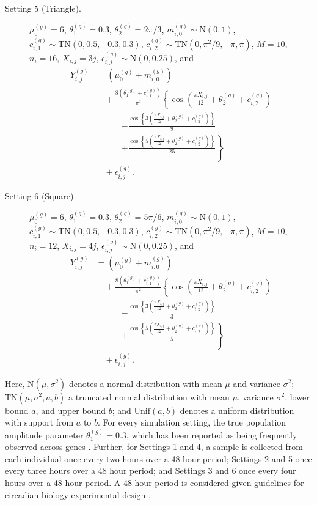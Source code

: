 \begin{description}
    \item[Setting 5 (Triangle).] $\mu^{(g)}_0=6$, $\theta^{(g)}_1 = 0.3$, $\theta^{(g)}_2 = 2\pi/3$, $m^{(g)}_{i,0} \sim \mathrm{N}(0, 1)$, $c^{(g)}_{i,1} \sim \mathrm{TN}(0, 0.5, -0.3, 0.3)$, $c^{(g)}_{i,2} \sim \mathrm{TN}(0, \pi^2/9, -\pi, \pi)$, $M = 10$, $n_i = 16$, $X_{i,j}=3j$, $\epsilon^{(g)}_{i,j} \sim \text{N}(0, 0.25)$, and 
    \begin{align*}
        Y^{(g)}_{i,j} &= (\mu^{(g)}_0+m^{(g)}_{i,0}) \\
        & \quad + \frac{8(\theta^{(g)}_1+c^{(g)}_{i,1})}{\pi^2}\left\{\cos\left(\frac{\pi X_{i,j}}{12} + \theta^{(g)}_2 + c^{(g)}_{i,2} \right) \right. \\
        & \quad \quad \quad \left. - \frac{\cos\left\{3\left(\frac{\pi X_{i,j}}{12} +  \theta^{(g)}_2 + c^{(g)}_{i,2} \right)\right\}}{9} \right. \\
        & \quad \quad \quad \left. + \frac{\cos\left\{5\left(\frac{\pi X_{i,j}}{12} +  \theta^{(g)}_2 + c^{(g)}_{i,2} \right)\right\}}{25}\right\} \\
        & \quad +\epsilon^{(g)}_{i,j}.
    \end{align*}
    \item[Setting 6 (Square).] $\mu^{(g)}_0=6$, $\theta^{(g)}_1 = 0.3$, $\theta^{(g)}_2 = 5\pi/6$, $m^{(g)}_{i,0} \sim \mathrm{N}(0, 1)$, $c^{(g)}_{i,1} \sim \mathrm{TN}(0, 0.5, -0.3, 0.3)$, $c^{(g)}_{i,2} \sim \mathrm{TN}(0, \pi^2/9, -\pi, \pi)$, $M = 10$, $n_i = 12$, $X_{i,j}=4j$, $\epsilon^{(g)}_{i,j} \sim \text{N}(0, 0.25)$, and \begin{align*}
        Y^{(g)}_{i,j} &= (\mu^{(g)}_0+m^{(g)}_{i,0}) \\
        & \quad + \frac{8(\theta^{(g)}_1+c^{(g)}_{i,1})}{\pi^2}\left\{\cos\left(\frac{\pi X_{i,j}}{12} + \theta^{(g)}_2 + c^{(g)}_{i,2} \right) \right. \\
        & \quad \quad \quad \left. - \frac{\cos\left\{3\left(\frac{\pi X_{i,j}}{12} +  \theta^{(g)}_2 + c^{(g)}_{i,2} \right)\right\}}{3} \right. \\
        & \quad \quad \quad \left. + \frac{\cos\left\{5\left(\frac{\pi X_{i,j}}{12} +  \theta^{(g)}_2 + c^{(g)}_{i,2} \right)\right\}}{5}\right\} \\
        & \quad +\epsilon^{(g)}_{i,j}.
    \end{align*}
 \end{description}
Here, $\mathrm{N}(\mu, \sigma^2)$ denotes a normal distribution with mean $\mu$ and variance $\sigma^2$; $\mathrm{TN}(\mu, \sigma^2, a, b)$ a truncated normal distribution with mean $\mu$, variance $\sigma^2$, lower bound $a$, and upper bound $b$; and $\mathrm{Unif}(a,b)$ denotes a uniform distribution with support from $a$ to $b$. For every simulation setting, the true population amplitude parameter $\theta_1^{(g)} = 0.3$, which has been reported as being frequently observed across genes \citep{MllerLevet2013}. Further, for Settings 1 and 4, a sample is collected from each individual once every two hours over a 48 hour period; Settings 2 and 5 once every three hours over a 48 hour period; and Settings 3 and 6 once every four hours over a 48 hour period. A 48 hour period is considered given guidelines for circadian biology experimental design \citep{Hughes2017}.


 


